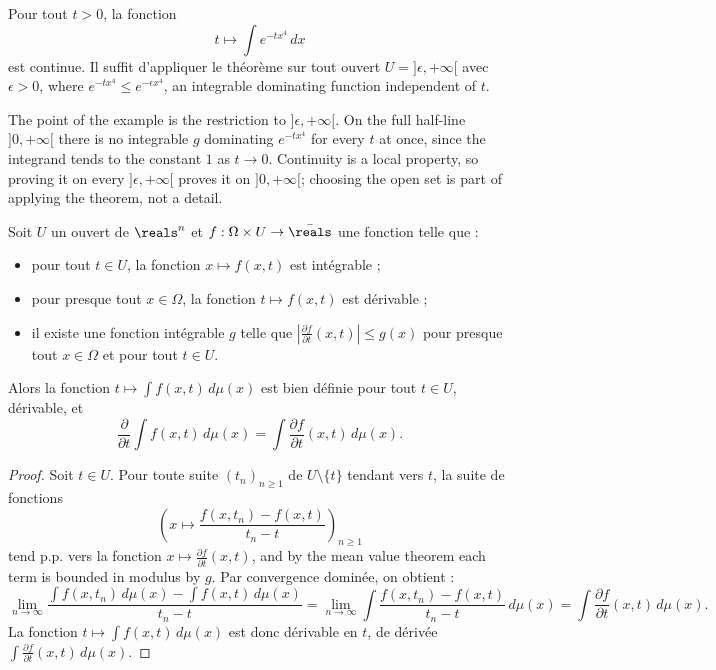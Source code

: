 \begin{example}
  Pour tout $t > 0$, la fonction
  \[
    t \mapsto \int e^{-tx^{4}} \, dx
  \]
  est continue. Il suffit d'appliquer le théorème sur tout ouvert $U =
  ]\epsilon,+\infty[$ avec $\epsilon > 0$, where $e^{-tx^{4}} \leq e^{-\epsilon
  x^{4}}$, an integrable dominating function independent of $t$.
\end{example}

\begin{remark}
  The point of the example is the restriction to $]\epsilon,+\infty[$. On the full
  half-line $]0,+\infty[$ there is no integrable $g$ dominating $e^{-tx^{4}}$ for
  every $t$ at once, since the integrand tends to the constant $1$ as $t \to 0$.
  Continuity is a local property, so proving it on every $]\epsilon,+\infty[$ proves
  it on $]0,+\infty[$; choosing the open set is part of applying the theorem, not a
  detail.
\end{remark}

\begin{theorem}
  Soit $U$ un ouvert de $\reals^{n}$ et $f : \Omega \times U \to \bar{\reals}$ une
  fonction telle que :
  \begin{itemize}
    \item pour tout $t \in U$, la fonction $x \mapsto f(x,t)$ est intégrable ;
    \item pour presque tout $x \in \Omega$, la fonction $t \mapsto f(x,t)$ est
      dérivable ;
    \item il existe une fonction intégrable $g$ telle que $\left| \frac{\partial
      f}{\partial t}(x,t) \right| \leq g(x)$ pour presque tout $x \in \Omega$ et pour
      tout $t \in U$.
  \end{itemize}
  Alors la fonction $t \mapsto \int f(x,t) \, d\mu(x)$ est bien définie pour tout $t
  \in U$, dérivable, et
  \[
    \frac{\partial}{\partial t} \int f(x,t) \, d\mu(x)
    = \int \frac{\partial f}{\partial t}(x,t) \, d\mu(x) .
  \]
\end{theorem}

\begin{proof}
  Soit $t \in U$. Pour toute suite $(t_{n})_{n \geq 1}$ de $U \setminus \{t\}$
  tendant vers $t$, la suite de fonctions
  \[
    \left( x \mapsto \frac{f(x,t_{n}) - f(x,t)}{t_{n} - t} \right)_{n \geq 1}
  \]
  tend p.p. vers la fonction $x \mapsto \frac{\partial f}{\partial t}(x,t)$, and by
  the mean value theorem each term is bounded in modulus by $g$. Par convergence
  dominée, on obtient :
  \[
    \lim_{n \to \infty} \frac{\int f(x,t_{n}) \, d\mu(x)
      - \int f(x,t) \, d\mu(x)}{t_{n} - t}
    = \lim_{n \to \infty} \int \frac{f(x,t_{n}) - f(x,t)}{t_{n} - t} \, d\mu(x)
    = \int \frac{\partial f}{\partial t}(x,t) \, d\mu(x) .
  \]
  La fonction $t \mapsto \int f(x,t) \, d\mu(x)$ est donc dérivable en $t$, de
  dérivée $\int \frac{\partial f}{\partial t}(x,t) \, d\mu(x)$.
\end{proof}

